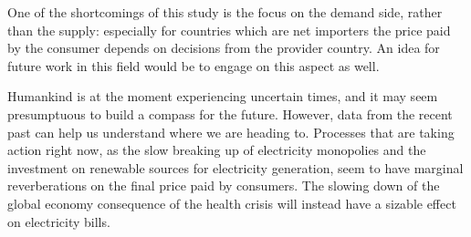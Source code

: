 \documentclass[a4paper,12pt]{book}
\begin{document}
One of the shortcomings of this study is the focus on the demand side, rather than the supply: especially for countries which are net importers the price paid by the consumer depends on decisions from the provider country. An idea for future work in this field would be to engage on this aspect as well.

Humankind is at the moment experiencing uncertain times, and it may seem presumptuous to build a compass for the future. However, data from the recent past can help us understand where we are heading to. Processes that are taking action right now, as the slow breaking up of electricity monopolies and the investment on renewable sources for electricity generation, seem to have marginal reverberations on the final price paid by consumers. The slowing down of the global economy consequence of the health crisis will instead have a sizable effect on electricity bills.
\end{document}
